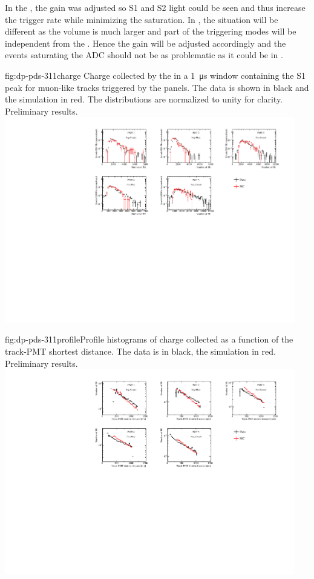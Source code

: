 In the , the  gain was adjusted so S1 and S2 light could be seen and thus increase the trigger rate while minimizing the   saturation. 
In \dune \dual, the situation will be different as the volume is much larger and part of the triggering modes will be independent from the . 
Hence the  gain will be adjusted accordingly and the events saturating the ADC should not be as problematic as it could be in .

\begin{dunefigure}{fig:dp-pds-311charge}{ Charge collected by the  in a \SI{1}{\us} window containing the S1 peak for muon-like tracks triggered by the  panels. The data is shown in black and the simulation in red. The distributions are normalized to unity for clarity. Preliminary results.}
\includegraphics[width=0.95\textwidth]{graphics/dppd_311_charge_mc_v2.pdf}
\end{dunefigure}

\begin{dunefigure}{fig:dp-pds-311profile}{Profile histograms of charge collected as a function of the track-PMT shortest distance. The data is in black, the simulation in red. Preliminary results.}
\includegraphics[width=0.95\textwidth]{graphics/dppd_311_charge_dist_mc.pdf}
\end{dunefigure}

